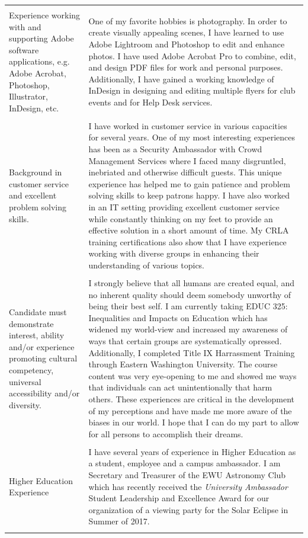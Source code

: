 \documentclass[a4paper,10pt]{article}
\begin{document}
\begin{longtable}{|p{.35\linewidth}|p{.6\linewidth}|}
	&\\
	Experience working with and supporting Adobe software applications, e.g. Adobe Acrobat, Photoshop, Illustrator, InDesign, etc.
	& One of my favorite hobbies is photography. In order to create visually appealing scenes, I have learned to use Adobe Lightroom and Photoshop to edit and enhance photos. I have used Adobe Acrobat Pro to combine, edit, and design PDF files for work and personal purposes. Additionally, I have gained a working knowledge of InDesign in designing and editing multiple flyers for club events and for Help Desk services.\\
	&\\
	Background in customer service and excellent problem solving skills.
	& I have worked in customer service in various capacities for several years. One of my most interesting experiences has been as a Security Ambassador with Crowd Management Services where I faced many disgruntled, inebriated and otherwise difficult guests. This unique experience has helped me to gain patience and problem solving skills to keep patrons happy. I have also worked in an IT setting providing excellent customer service while constantly thinking on my feet to provide an effective solution in a short amount of time. My CRLA training certifications also show that I have experience working with diverse groups in enhancing their understanding of various topics.\\
	&\\
	Candidate must demonstrate interest, ability and/or experience promoting cultural competency, universal accessibility and/or diversity.
	& I strongly believe that all humans are created equal, and no inherent quality should deem somebody unworthy of being their best self. I am currently taking EDUC 325: Inequalities and Impacts on Education which has widened my world-view and increased my awareness of ways that certain groups are systematically opressed. Additionally, I completed Title IX Harrassment Training through Eastern Washington University. The course content was very eye-opening to me and showed me ways that individuals can act unintentionally that harm others. These experiences are critical in the development of my perceptions and have made me more aware of the biases in our world. I hope that I can do my part to allow for all persons to accomplish their dreams.\\
	&\\
	Higher Education Experience & I have several years of experience in Higher Education as a student, employee and a campus ambassador. I am Secretary and Treasurer of the EWU Astronomy Club which has recently received the \textit{University Ambassador} Student Leadership and Excellence Award for our organization of a viewing party for the Solar Eclipse in Summer of 2017.\\
	&\\
	
\end{longtable}
\end{document}
